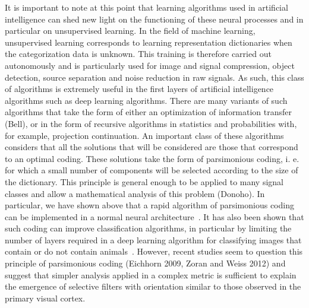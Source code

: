 \documentclass[a4paper, 11pt, draft]{article} %
\begin{document}
It is important to note at this point that learning algorithms used in artificial intelligence can shed new light on the functioning of these neural processes and in particular on unsupervised learning. In the field of machine learning, unsupervised learning corresponds to learning representation dictionaries when the categorization data is unknown. This training is therefore carried out autonomously and is particularly used for image and signal compression, object detection, source separation and noise reduction in raw signals. As such, this class of algorithms is extremely useful in the first layers of artificial intelligence algorithms such as deep learning algorithms. There are many variants of such algorithms that take the form of either an optimization of information transfer (Bell), or in the form of recursive algorithms in statistics and probabilities with, for example, projection continuation. An important class of these algorithms considers that all the solutions that will be considered are those that correspond to an optimal coding. These solutions take the form of parsimonious coding, i. e. for which a small number of components will be selected according to the size of the dictionary. This principle is general enough to be applied to many signal classes and allow a mathematical analysis of this problem (Donoho). In particular, we have shown above that a rapid algorithm of parsimonious coding can be implemented in a normal neural architecture~\citep{Perrinet10shl}. It has also been shown that such coding can improve classification algorithms, in particular by limiting the number of layers required in a deep learning algorithm for classifying images that contain or do not contain animals~\citep{PerrinetBednar15}. However, recent studies seem to question this principle of parsimonious coding (Eichhorn 2009, Zoran and Weiss 2012) and suggest that simpler analysis applied in a complex metric is sufficient to explain the emergence of selective filters with orientation similar to those observed in the primary visual cortex.
\end{document}
